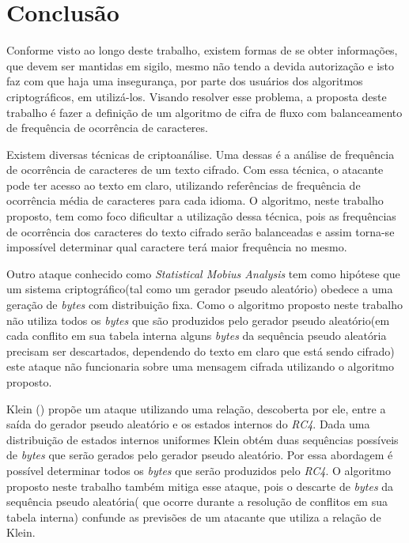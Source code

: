 \chapter{Conclusão}
\label{conclusion}


Conforme visto ao longo deste trabalho, existem formas de se obter informações, que devem ser mantidas em sigilo, mesmo não tendo a devida autorização e isto faz com que haja uma insegurança, por parte dos usuários dos algoritmos criptográficos, em utilizá-los. Visando resolver esse problema, a proposta deste trabalho é fazer a definição de um algoritmo de cifra de fluxo com balanceamento de frequência de ocorrência de caracteres.

Existem diversas técnicas de criptoanálise. Uma dessas é a análise de frequência de ocorrência de caracteres de um texto cifrado. Com essa técnica, o atacante pode ter acesso ao texto em claro, utilizando referências de frequência de ocorrência média de caracteres para cada idioma. O algoritmo, neste trabalho proposto, tem como foco dificultar a utilização dessa técnica, pois as frequências de ocorrência dos caracteres do texto cifrado serão balanceadas e assim torna-se impossível determinar qual caractere terá maior frequência no mesmo.

Outro ataque conhecido como \textit{Statistical Mobius Analysis} tem como hipótese  que um sistema criptográfico(tal como um gerador pseudo aleatório) obedece a uma geração de \textit{bytes} com distribuição fixa\cite{eric-filiol}. Como o algoritmo proposto neste trabalho não utiliza todos os \textit{bytes} que são produzidos pelo gerador pseudo aleatório(em cada conflito em sua tabela interna alguns \textit{bytes} da sequência pseudo aleatória precisam ser descartados, dependendo do texto em claro que está sendo cifrado) este ataque não funcionaria sobre uma mensagem cifrada utilizando o algoritmo proposto.

Klein (\citeyear{andreas-klein}) propõe um ataque utilizando uma relação, descoberta por ele, entre a saída do gerador pseudo aleatório e os estados internos do \textit{RC4}. Dada uma distribuição de estados internos uniformes Klein obtém duas sequências possíveis de \textit{bytes} que serão gerados pelo gerador pseudo aleatório. Por essa abordagem é possível determinar todos os \textit{bytes} que serão produzidos pelo \textit{RC4}. O algoritmo proposto neste trabalho também mitiga esse ataque, pois o descarte de \textit{bytes} da sequência pseudo aleatória( que ocorre durante a resolução de conflitos em sua tabela interna) confunde as previsões de um atacante que utiliza a relação de Klein.
 
